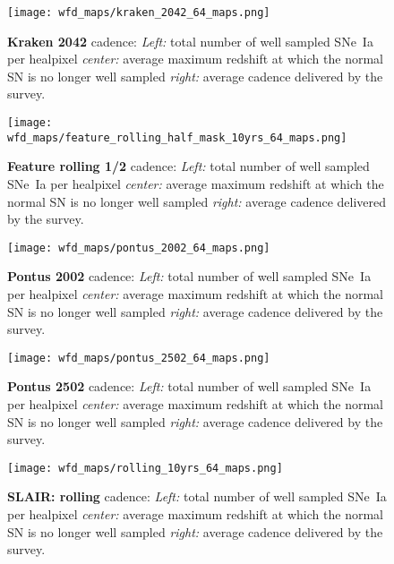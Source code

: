 \begin{figure}[h!]
  \begin{center}
    \texttt{[image: wfd\_maps/kraken\_2042\_64\_maps.png]}
    \caption{{\bf Kraken 2042} cadence: {\em Left:} total number of well
      sampled SNe~Ia per healpixel {\em center:} average maximum
      redshift at which the normal SN is no longer well sampled {\em
        right:} average cadence delivered by the survey.}
    \label{fig:kraken_2042}
  \end{center}
\end{figure}

\begin{figure}[h!]
  \begin{center}
    \texttt{[image: wfd\_maps/feature\_rolling\_half\_mask\_10yrs\_64\_maps.png]}
    \caption{{\bf Feature rolling 1/2} cadence: {\em Left:} total number of well
      sampled SNe~Ia per healpixel {\em center:} average maximum
      redshift at which the normal SN is no longer well sampled {\em
        right:} average cadence delivered by the survey.}
    \label{fig:feature_rolling_half_mask}
  \end{center}
\end{figure}


\begin{figure}[h!]
  \begin{center}
    \texttt{[image: wfd\_maps/pontus\_2002\_64\_maps.png]}
    \caption{{\bf Pontus 2002} cadence: {\em Left:} total number of well
      sampled SNe~Ia per healpixel {\em center:} average maximum
      redshift at which the normal SN is no longer well sampled {\em
        right:} average cadence delivered by the survey.}
    \label{fig:pontus_2002}
  \end{center}
\end{figure}

\begin{figure}[h!]
  \begin{center}
    \texttt{[image: wfd\_maps/pontus\_2502\_64\_maps.png]}
    \caption{{\bf Pontus 2502} cadence: {\em Left:} total number of well
      sampled SNe~Ia per healpixel {\em center:} average maximum
      redshift at which the normal SN is no longer well sampled {\em
        right:} average cadence delivered by the survey.}
    \label{fig:pontus_2502}
  \end{center}
\end{figure}

\begin{figure}[h!]
  \begin{center}
    \texttt{[image: wfd\_maps/rolling\_10yrs\_64\_maps.png]}
    \caption{{\bf SLAIR: rolling} cadence: {\em Left:} total number of well
      sampled SNe~Ia per healpixel {\em center:} average maximum
      redshift at which the normal SN is no longer well sampled {\em
        right:} average cadence delivered by the survey.}
    \label{fig:slair_rolling}
  \end{center}
\end{figure}

